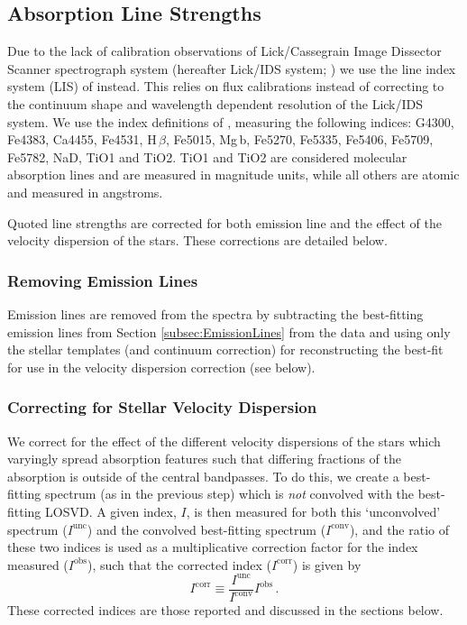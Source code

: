 \documentclass[a4paper,fleqn,usenatbib]{mnras}
\begin{document}
	\subsection{Absorption Line Strengths}
		\label{subsec:absorption}
		Due to the lack of calibration observations of Lick/Cassegrain Image Dissector Scanner spectrograph system (hereafter Lick/IDS system; \citealt{Faber1985, Worthey1994}) we use the line index system (LIS) of \citet{Vazdekis2010} instead. This relies on flux calibrations instead of correcting to the continuum shape and wavelength dependent resolution of the Lick/IDS system. We use the index definitions of \citet{Trager1998}, measuring the following indices: G4300, Fe4383, Ca4455, Fe4531, H\,$\beta$, Fe5015, Mg\,b, Fe5270, Fe5335, Fe5406, Fe5709, Fe5782, NaD, TiO1 and TiO2. TiO1 and TiO2 are considered molecular absorption lines and are measured in magnitude units, while all others are atomic and measured in angstroms. 

		Quoted line strengths are corrected for both emission line and the effect of the velocity dispersion of the stars. These corrections are detailed below.

		\subsubsection{Removing Emission Lines}
			Emission lines are removed from the spectra by subtracting the best-fitting emission lines from Section \ref{subsec:EmissionLines} from the data and using only the stellar templates (and continuum correction) for reconstructing the best-fit for use in the velocity dispersion correction (see below).

		\subsubsection{Correcting for Stellar Velocity Dispersion}
			\label{subsubsec:EmissionFit}
			We correct for the effect of the different velocity dispersions of the stars which varyingly spread absorption features such that differing fractions of the absorption is outside of the central bandpasses. To do this, we create a best-fitting spectrum (as in the previous step) which is \textit{not} convolved with the best-fitting LOSVD. A given index, $I$, is then measured for both this `unconvolved' spectrum ($I^\text{unc}$) and the convolved best-fitting spectrum ($I^\text{conv}$), and the ratio of these two indices is used as a multiplicative correction factor for the index measured ($I^\text{obs}$), such that the corrected index ($I^\text{corr}$) is given by
			\begin{equation}
				I^\text{corr} \equiv \frac{I^\text{unc}}{I^\text{conv}} I^\text{obs} \, .
			\end{equation}
			These corrected indices are those reported and discussed in the sections below.
\end{document}
